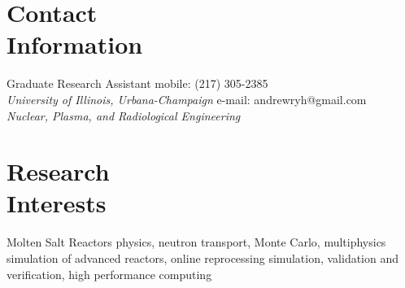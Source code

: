 \documentclass[margin,line]{resume}
\begin{document}
\begin{resume}

    \section{\mysidestyle Contact\\Information}

    Graduate Research Assistant \hfill mobile: (217) 305-2385 \vspace{0mm}\\\vspace{0mm}
        \textsl{University of Illinois, Urbana-Champaign}
        \hfill e-mail: andrewryh@gmail.com            \vspace{0mm}\\\vspace{0mm}%
    \textsl{Nuclear, Plasma, and Radiological Engineering}
       
    \section{\mysidestyle Research\\Interests}
		Molten Salt Reactors physics, neutron transport, Monte Carlo, multiphysics simulation of advanced reactors, online reprocessing simulation, validation and verification, high performance computing

\end{resume}
\end{document}
